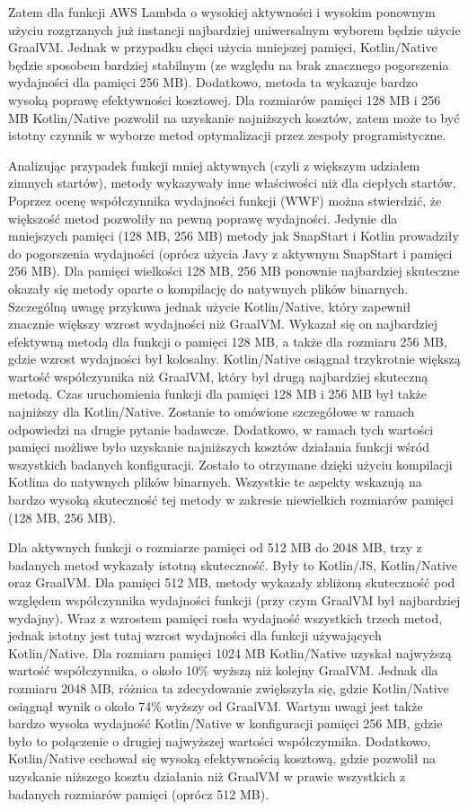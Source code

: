 Zatem dla funkcji AWS Lambda o wysokiej aktywności i wysokim ponownym użyciu rozgrzanych już instancji najbardziej uniwersalnym wyborem będzie użycie GraalVM.
Jednak w przypadku chęci użycia mniejszej pamięci, Kotlin/Native będzie sposobem bardziej stabilnym (ze względu na brak znacznego pogorszenia wydajności dla pamięci 256 MB).
Dodatkowo, metoda ta wykazuje bardzo wysoką poprawę efektywności kosztowej.
Dla rozmiarów pamięci 128 MB i 256 MB Kotlin/Native pozwolił na uzyskanie najniższych kosztów, zatem może to być istotny czynnik w wyborze metod optymalizacji przez zespoły programistyczne.

Analizując przypadek funkcji mniej aktywnych (czyli z większym udziałem zimnych startów), metody wykazywały inne właściwości niż dla ciepłych startów.
Poprzez ocenę współczynnika wydajności funkcji (WWF) można stwierdzić, że większość metod pozwoliły na pewną poprawę wydajności.
Jedynie dla mniejszych pamięci (128 MB, 256 MB) metody jak SnapStart i Kotlin prowadziły do pogorszenia wydajności (oprócz użycia Javy z aktywnym SnapStart i pamięci 256 MB).
Dla pamięci wielkości 128 MB, 256 MB ponownie najbardziej skuteczne okazały się metody oparte o kompilację do natywnych plików binarnych.
Szczególną uwagę przykuwa jednak użycie Kotlin/Native, który zapewnił znacznie większy wzrost wydajności niż GraalVM.
Wykazał się on najbardziej efektywną metodą dla funkcji o pamięci 128 MB, a także dla rozmiaru 256 MB, gdzie wzrost wydajności był kolosalny.
Kotlin/Native osiągnał trzykrotnie większą wartość współczynnika niż GraalVM, który był drugą najbardziej skuteczną metodą.
Czas uruchomienia funkcji dla pamięci 128 MB i 256 MB był także najniższy dla Kotlin/Native.
Zostanie to omówione szczegółowe w ramach odpowiedzi na drugie pytanie badawcze.
Dodatkowo, w ramach tych wartości pamięci możliwe było uzyskanie najniższych kosztów działania funkcji wśród wszystkich badanych konfiguracji.
Zostało to otrzymane dzięki użyciu kompilacji Kotlina do natywnych plików binarnych.
Wszystkie te aspekty wskazują na bardzo wysoką skuteczność tej metody w zakresie niewielkich rozmiarów pamięci (128 MB, 256 MB).

Dla aktywnych funkcji o rozmiarze pamięci od 512 MB do 2048 MB, trzy z badanych metod wykazały istotną skuteczność.
Były to Kotlin/JS, Kotlin/Native oraz GraalVM.
Dla pamięci 512 MB, metody wykazały zbliżoną skuteczność pod względem współczynnika wydajności funkcji (przy czym GraalVM był najbardziej wydajny).
Wraz z wzrostem pamięci rosła wydajność wszystkich trzech metod, jednak istotny jest tutaj wzrost wydajności dla funkcji używających Kotlin/Native.
Dla rozmiaru pamięci 1024 MB Kotlin/Native uzyskał najwyższą wartość współczynnika, o około 10\% wyższą niż kolejny GraalVM.
Jednak dla rozmiaru 2048 MB, różnica ta zdecydowanie zwiększyła się, gdzie Kotlin/Native osiągnął wynik o około 74\% wyższy od GraalVM.
Wartym uwagi jest także bardzo wysoka wydajność Kotlin/Native w konfiguracji pamięci 256 MB, gdzie było to połączenie o drugiej najwyższej wartości współczynnika.
Dodatkowo, Kotlin/Native cechował się wysoką efektywnością kosztową, gdzie pozwolił na uzyskanie niższego kosztu działania niż GraalVM w prawie wszystkich z badanych rozmiarów pamięci (oprócz 512 MB).

